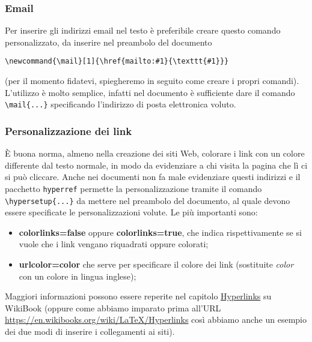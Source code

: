 \subsubsection{Email}\label{subsec:email}
Per inserire gli indirizzi email nel testo è preferibile creare questo comando 
personalizzato, da inserire nel preambolo del documento
\begin{lstlisting}
\newcommand{\mail}[1]{\href{mailto:#1}{\texttt{#1}}}
\end{lstlisting}
(per il momento fidatevi, spiegheremo in seguito come creare i propri 
comandi). L'utilizzo è molto semplice, infatti nel documento è sufficiente 
dare il comando \verb!\mail{...}! specificando l'indirizzo di posta 
elettronica voluto.

\subsubsection{Personalizzazione dei link}
È buona norma, almeno nella creazione dei siti Web, colorare i link con un 
colore differente dal testo normale, in modo da evidenziare a chi visita la 
pagina che lì ci si può cliccare. Anche nei documenti non fa male evidenziare 
questi indirizzi e il pacchetto \verb!hyperref! permette la personalizzazione 
tramite il comando \verb!\hypersetup{...}! da mettere nel preambolo del 
documento, al quale devono essere specificate le personalizzazioni volute. Le 
più importanti sono:
\begin{itemize}
    \item \textbf{colorlinks=false} oppure \textbf{colorlinks=true}, che 
    indica rispettivamente se si vuole che i link vengano riquadrati oppure 
    colorati;
    \item \textbf{urlcolor=color} che serve per specificare il colore dei link 
    (sostituite \textit{color} con un colore in lingua inglese);
\end{itemize}
Maggiori informazioni possono essere reperite nel capitolo 
\href{https://en.wikibooks.org/wiki/LaTeX/Hyperlinks}{Hyperlinks} su WikiBook 
(oppure come abbiamo imparato prima all'URL 
\url{https://en.wikibooks.org/wiki/LaTeX/Hyperlinks} così abbiamo anche un 
esempio dei due modi di inserire i collegamenti ai siti).

